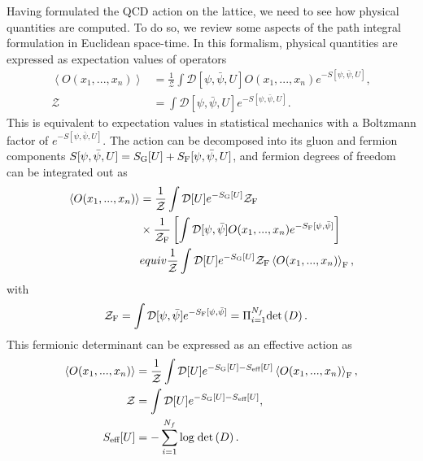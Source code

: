Having formulated the QCD action on the lattice, we need to see how physical quantities are computed. To do so, we review some aspects of the path integral formulation in Euclidean space-time. In this formalism, physical quantities are expressed as expectation values of operators
\begin{align}
\left<{O}(x_1,...,x_n)\right>&=\frac{1}{\mathcal{Z}}\int\mathcal{D}[\psi,\bar{\psi},U]{O}(x_1,...,x_n)e^{-S[\psi,\bar{\psi},U]}, \\
\mathcal{Z}&=\int\mathcal{D}[\psi,\bar{\psi},U]e^{-S[\psi,\bar{\psi},U]}.
\end{align}
This is equivalent to expectation values in statistical mechanics with a Boltzmann factor of $e^{-S[\psi,\bar{\psi},U]}$. The action can be decomposed into its gluon and fermion components $S[\psi,\bar{\psi},U]=S_{\textrm G}[U]+S_{\textrm F}[\psi,\bar{\psi},U]$, and fermion degrees of freedom can be integrated out as
\begin{align}
\left<{O}(x_1,...,x_n)\right>&=\frac{1}{\mathcal{Z}}\int\mathcal{D}[U]e^{-S_{\textrm G}[U]}\mathcal{Z}_{\textrm F}\notag \\
&\times\frac{1}{\mathcal{Z}_{\textrm F}}\left[\int\mathcal{D}[\psi,\bar{\psi}]{O}(x_1,...,x_n)e^{-S_{\textrm F}[\psi,\bar{\psi}]}\right] \\
&equiv\frac{1}{\mathcal{Z}}\int\mathcal{D}[U]e^{-S_{\textrm G}[U]}\mathcal{Z}_{\textrm F}\left<{O}(x_1,...,x_n)\right>_{\textrm F},
\end{align}
with 
\begin{align}
\mathcal{Z}_{\textrm F}&=\int\mathcal{D}[\psi,\bar{\psi}]e^{-S_{\textrm F}[\psi,\bar{\psi}]}=\Pi_{i=1}^{N_f}{\textrm{det}}\left(D\right).
\end{align}
This fermionic determinant can be expressed as an effective action as
\begin{align}
\left<{O}(x_1,...,x_n)\right>&=\frac{1}{\mathcal{Z}}\int\mathcal{D}[U]e^{-S_{\textrm G}[U]-S_{\textrm{eff}}[U]}\left<{O}(x_1,...,x_n)\right>_{\textrm F}, \\
\mathcal{Z}&=\int\mathcal{D}[U]e^{-S_{\textrm G}[U]-S_{\textrm{eff}}[U]}, \\
S_{\textrm{eff}}[U]&=-\sum_{i=1}^{N_f}{\textrm{log}}\;{\textrm{det}}\left(D\right).
\end{align}

